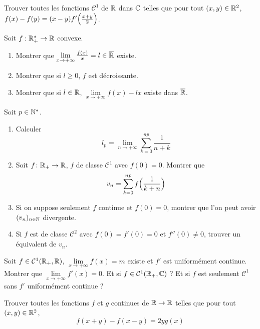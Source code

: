 \begin{exercise}
	Trouver toutes les fonctions $\mathcal{C}^{1}$ de $\mathbb{R}$ dans $\mathbb{C}$ telles que pour tout $(x,y)\in\mathbb{R}^{2}$, $f(x)-f(y)=(x-y)f'\Bigl(\frac{x+y}{2}\Bigr)$.
\end{exercise}

\begin{exercise}
	Soit $f:\mathbb{R}_{+}^{*}\to\mathbb{R}$ convexe.
	\begin{enumerate}
		\item Montrer que $\lim\limits_{x\to+\infty}\frac{f(x)}{x}=l\in\overline{\mathbb{R}}$ existe.
		\item Montrer que si $l\geqslant0$, $f$ est décroissante.
		\item Montrer que si $l\in\mathbb{R}$, $\lim\limits_{x\to+\infty}f(x)-lx$ existe dans $\overline{\mathbb{R}}$.
	\end{enumerate}
\end{exercise}

\begin{exercise}
	Soit $p\in\mathbb{N}^{*}$.
	\begin{enumerate}
		\item Calculer 
		$$l_{p}=\lim\limits_{n\to+\infty}\sum_{k=0}^{np}\frac{1}{n+k}$$
		\item Soit $f\colon\mathbb{R}_{+}\to\mathbb{R}$, $f$ de classe $\mathcal{C}^{1}$ avec $f(0)=0$. Montrer que 
		$$v_{n}=\sum_{k=0}^{np}f\Bigl(\frac{1}{k+n}\Bigr)$$
		\item Si on suppose seulement $f$ continue et $f(0)=0$, montrer que l'on peut avoir $(v_{n})_{n\in\mathbb{N}}$ divergente.
		\item Si $f$ est de classe $\mathcal{C}^{2}$ avec $f(0)=f'(0)=0$ et $f''(0)\neq0$, trouver un équivalent de $v_{n}$.
	\end{enumerate}
\end{exercise}

\begin{exercise}
	Soit $f\in\mathcal{C}^{1}(\mathbb{R}_{+},\mathbb{R})$, $\lim\limits_{x\to+\infty}f(x)=m$ existe et $f'$ est uniformément continue. Montrer que $\lim\limits_{x\to+\infty}f'(x)=0$. Et si $f\in\mathcal{C}^{1}(\mathbb{R}_{+},\mathbb{C})$ ? Et si $f$ est seulement $\mathcal{C}^{1}$ sans $f'$ uniformément continue ?
\end{exercise}

\begin{exercise}
	Trouver toutes les fonctions $f$ et $g$ continues de $\mathbb{R}\to\mathbb{R}$ telles que pour tout $(x,y)\in\mathbb{R}^{2}$,
	$$f(x+y)-f(x-y)=2yg(x)$$
\end{exercise}

